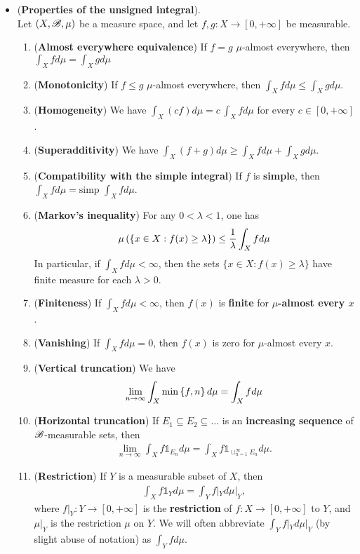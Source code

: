 \documentclass[11pt]{article}
\begin{document}
\begin{itemize}
\item \begin{proposition} (\textbf{Properties of the unsigned integral}). \\
Let $(X,{\mathscr B}, \mu)$ be a measure space, and let $f, g : X \rightarrow [0, +\infty]$ be measurable.
\begin{enumerate}
\item (\textbf{Almost everywhere equivalence}) If $f = g$ $\mu$-almost everywhere, then $\int_X f d\mu = \int_X g d\mu$
\item (\textbf{Monotonicity}) If $f \le g$ $\mu$-almost everywhere, then $\int_X f d\mu \le \int_X g d\mu$.
\item (\textbf{Homogeneity}) We have $\int_X (cf) d\mu = c\, \int_X f d\mu$ for every $c \in [0, +\infty]$.
\item (\textbf{Superadditivity}) We have $\int_X (f+g) d\mu \ge \int_X f d\mu + \int_X g d\mu$.
\item (\textbf{Compatibility with the simple integral}) If $f$ is \textbf{simple}, then $\int_X f d\mu = \text{simp }\int_X f d\mu$.
\item (\textbf{Markov's inequality}) For any $0 < \lambda < 1$, one has 
\begin{align*}
\mu\left(\left\{x \in X: f(x) \ge \lambda\right\}\right) \le \frac{1}{\lambda}\int_{X} f d\mu
\end{align*}
In particular, if $\int_X f d\mu < \infty$, then the sets $\{x \in X : f(x) \ge \lambda \}$ have finite measure for each $\lambda > 0$.
\item (\textbf{Finiteness}) If $\int_X f d\mu < \infty$, then $f(x)$ is \textbf{finite} for \textbf{$\mu$-almost every $x$}.
\item (\textbf{Vanishing}) If $\int_X f d\mu = 0$, then $f(x)$ is zero for $\mu$-almost every $x$.
\item (\textbf{Vertical truncation}) We have 
\begin{align*}
\lim\limits_{n \rightarrow \infty} \int_{X} \min\left\{f, n\right\} d\mu = \int_{X} f d \mu
\end{align*}
\item  (\textbf{Horizontal truncation}) If $E_1 \subseteq E_2 \subseteq \ldots$ is an \textbf{increasing sequence} of ${\mathscr B}$-measurable sets, then
\begin{align*}
\lim\limits_{n\rightarrow \infty} \int_X f \mathds{1}_{E_n} d\mu = \int_X f  \mathds{1}_{\cup_{n=1}^{\infty}E_n} d\mu.
\end{align*}
\item (\textbf{Restriction}) If $Y$ is a measurable subset of $X$, then 
\begin{align*}
\int_X f \mathds{1}_{Y} d\mu = \int_Y f|_{Y}  d\mu|_{Y},
\end{align*}
where $f|_{Y}: Y \rightarrow [0, +\infty]$ is the \textbf{restriction} of $f : X \rightarrow [0, +\infty]$ to $Y$, and $\mu|_{Y}$ is the restriction $\mu$ on $Y$. We will often abbreviate
$ \int_Y f|_{Y}  d\mu|_{Y}$ (by slight abuse of notation) as $\int_Y f d\mu$.
\end{enumerate}
\end{proposition}


\end{itemize}
\end{document}

